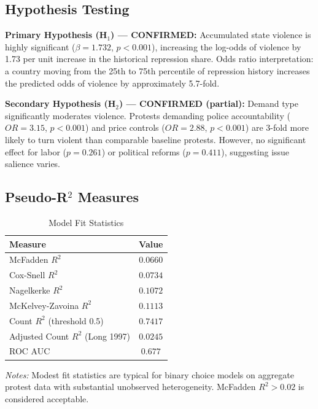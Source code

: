 \documentclass[11pt,a4paper]{article}
\begin{document}
\subsection{Hypothesis Testing}

\textbf{Primary Hypothesis (H$_1$) --- CONFIRMED:} Accumulated state violence is highly significant ($\beta = 1.732$, $p < 0.001$), increasing the log-odds of violence by 1.73 per unit increase in the historical repression share. Odds ratio interpretation: a country moving from the 25th to 75th percentile of repression history increases the predicted odds of violence by approximately 5.7-fold.

\textbf{Secondary Hypothesis (H$_2$) --- CONFIRMED (partial):} Demand type significantly moderates violence. Protests demanding police accountability ($OR = 3.15$, $p < 0.001$) and price controls ($OR = 2.88$, $p < 0.001$) are 3-fold more likely to turn violent than comparable baseline protests. However, no significant effect for labor ($p = 0.261$) or political reforms ($p = 0.411$), suggesting issue salience varies.

\subsection{\texorpdfstring{Pseudo-R$^2$ Measures}{Pseudo-R2 Measures}}

\begin{table}[ht!]
\centering
\caption{Model Fit Statistics}
\label{tab:r2}
\small
\begin{tabular}{lc}
\toprule
\textbf{Measure} & \textbf{Value} \\
\midrule
McFadden $R^2$ & $0.0660$ \\
Cox-Snell $R^2$ & $0.0734$ \\
Nagelkerke $R^2$ & $0.1072$ \\
McKelvey-Zavoina $R^2$ & $0.1113$ \\
Count $R^2$ (threshold 0.5) & $0.7417$ \\
Adjusted Count $R^2$ (Long 1997) & $0.0245$ \\
ROC AUC & $0.677$ \\
\bottomrule
\end{tabular}

\vspace{0.3cm}

\footnotesize
\textit{Notes:} Modest fit statistics are typical for binary choice models on aggregate protest data with substantial unobserved heterogeneity. McFadden $R^2 > 0.02$ is considered acceptable.
\end{table}
\end{document}
